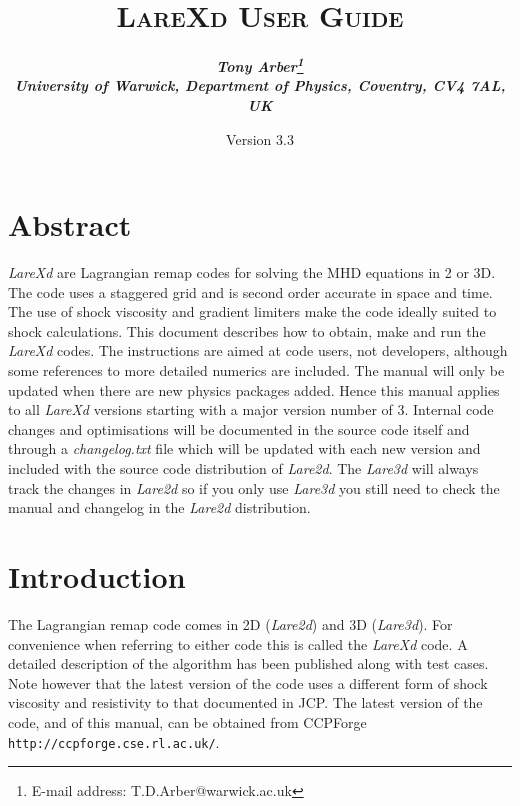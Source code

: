 \documentclass[11pt]{article}
\begin{document}
\title{
\bfseries\scshape LareXd User Guide}
\author{\bfseries\itshape Tony Arber\thanks{E-mail address: T.D.Arber@warwick.ac.uk}\\
University of Warwick, Department of Physics, Coventry, CV4 7AL, UK}
\date{Version 3.3}
\maketitle

\thispagestyle{empty}

\section*{Abstract}
{\it LareXd} are Lagrangian remap codes for solving the MHD equations in 2 or 3D. The code uses a staggered grid 
and is second order accurate in space and time. The use of shock viscosity and gradient limiters make the code 
ideally suited to shock calculations. This document describes how to obtain, make and run the {\it LareXd}  
codes. The instructions are aimed at code users, not developers, although some references to more detailed 
numerics are included. The manual will only be
updated when there are new physics packages added. Hence this manual applies to all {\it LareXd} versions 
starting with a major version number of 3. Internal code changes and optimisations will be documented in the 
source code itself and through a {\it changelog.txt} file which will be updated with each new version and 
included with the source code distribution of {\it Lare2d}. The {\it Lare3d} will always track the changes 
in {\it Lare2d} so if you only use {\it Lare3d} you still need to check the manual and changelog in the 
{\it Lare2d} distribution.


\section{Introduction}
The Lagrangian remap code comes in 2D ({\it Lare2d}) and 3D ({\it Lare3d}). For convenience when referring 
to either code this is called the {\it LareXd} code. A detailed description of the algorithm has been 
published \cite{jcp} along with test cases. Note however that the latest version of the code uses a 
different form of shock viscosity and resistivity to that documented in JCP. The latest version of the 
code, and of this manual, can be obtained from CCPForge {\tt http://ccpforge.cse.rl.ac.uk/}.
\end{document}
